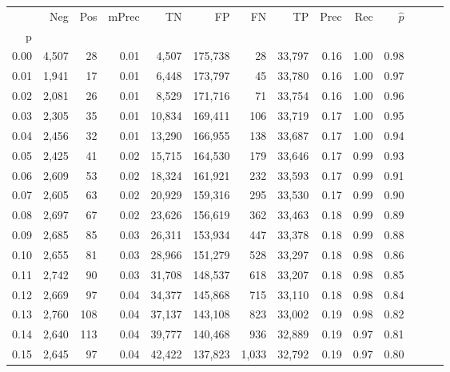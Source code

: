 \begin{tabular}{rrrrrrrrrrrrrr}
\toprule
{} &    Neg &    Pos & mPrec &       TN &       FP &      FN &      TP &  Prec &   Rec & $\hat{p}$ \\
p    &        &        &       &          &          &         &         &       &       &           \\
\midrule
0.00 &  4,507 &     28 &  0.01 &    4,507 &  175,738 &      28 &  33,797 &  0.16 &  1.00 &      0.98 \\
0.01 &  1,941 &     17 &  0.01 &    6,448 &  173,797 &      45 &  33,780 &  0.16 &  1.00 &      0.97 \\
0.02 &  2,081 &     26 &  0.01 &    8,529 &  171,716 &      71 &  33,754 &  0.16 &  1.00 &      0.96 \\
0.03 &  2,305 &     35 &  0.01 &   10,834 &  169,411 &     106 &  33,719 &  0.17 &  1.00 &      0.95 \\
0.04 &  2,456 &     32 &  0.01 &   13,290 &  166,955 &     138 &  33,687 &  0.17 &  1.00 &      0.94 \\
0.05 &  2,425 &     41 &  0.02 &   15,715 &  164,530 &     179 &  33,646 &  0.17 &  0.99 &      0.93 \\
0.06 &  2,609 &     53 &  0.02 &   18,324 &  161,921 &     232 &  33,593 &  0.17 &  0.99 &      0.91 \\
0.07 &  2,605 &     63 &  0.02 &   20,929 &  159,316 &     295 &  33,530 &  0.17 &  0.99 &      0.90 \\
0.08 &  2,697 &     67 &  0.02 &   23,626 &  156,619 &     362 &  33,463 &  0.18 &  0.99 &      0.89 \\
0.09 &  2,685 &     85 &  0.03 &   26,311 &  153,934 &     447 &  33,378 &  0.18 &  0.99 &      0.88 \\
0.10 &  2,655 &     81 &  0.03 &   28,966 &  151,279 &     528 &  33,297 &  0.18 &  0.98 &      0.86 \\
0.11 &  2,742 &     90 &  0.03 &   31,708 &  148,537 &     618 &  33,207 &  0.18 &  0.98 &      0.85 \\
0.12 &  2,669 &     97 &  0.04 &   34,377 &  145,868 &     715 &  33,110 &  0.18 &  0.98 &      0.84 \\
0.13 &  2,760 &    108 &  0.04 &   37,137 &  143,108 &     823 &  33,002 &  0.19 &  0.98 &      0.82 \\
0.14 &  2,640 &    113 &  0.04 &   39,777 &  140,468 &     936 &  32,889 &  0.19 &  0.97 &      0.81 \\
0.15 &  2,645 &     97 &  0.04 &   42,422 &  137,823 &   1,033 &  32,792 &  0.19 &  0.97 &      0.80 \\

\end{tabular}
